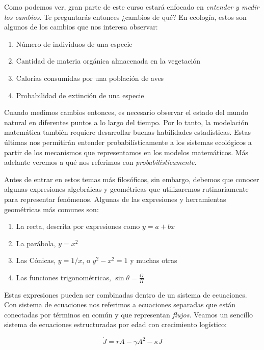 \documentclass[
]{book}
\providecommand{\tightlist}{%
  \setlength{\itemsep}{0pt}\setlength{\parskip}{0pt}}
\begin{document}
Como podemos ver, gran parte de este curso estará enfocado en \emph{entender y medir los cambios}. Te preguntarás entonces ¿cambios de qué? En ecología, estos son algunos de los cambios que nos interesa observar:

\begin{enumerate}
\def\labelenumi{\arabic{enumi}.}
\tightlist
\item
  Número de individuos de una especie
\item
  Cantidad de materia orgánica almacenada en la vegetación
\item
  Calorías consumidas por una población de aves
\item
  Probabilidad de extinción de una especie
\end{enumerate}

Cuando medimos cambios entonces, es necesario observar el estado del mundo natural en diferentes puntos a lo largo del tiempo. Por lo tanto, la modelación matemática también requiere desarrollar buenas habilidades estadísticas. Estas últimas nos permitirán entender probabilísticamente a los sistemas ecológicos a partir de los mecanismos que representamos en los modelos matemáticos. Más adelante veremos a qué nos referimos con \emph{probabilísticamente}.

Antes de entrar en estos temas más filosóficos, sin embargo, debemos que conocer algunas expresiones algebráicas y geométricas que utilizaremos rutinariamente para representar fenómenos. Algunas de las expresiones y herramientas geométricas más comunes son:

\begin{enumerate}
\def\labelenumi{\arabic{enumi}.}
\tightlist
\item
  La recta, descrita por expresiones como \(y = a + bx\)
\item
  La parábola, \(y = x^2\)
\item
  Las Cónicas, \(y = 1/x\), o \(y^2 - x^2 = 1\) y muchas otras
\item
  Las funciones trigonométricas, \(\sin \theta = \frac{O}{H}\)
\end{enumerate}

Estas expresiones pueden ser combinadas dentro de un sistema de ecuaciones. Con sistema de ecuaciones nos referimos a ecuaciones separadas que están conectadas por términos en común y que representan \emph{flujos}. Veamos un sencillo sistema de ecuaciones estructuradas por edad con crecimiento logístico:

\begin{equation}
    \dot{J} = rA - \gamma A^2 - \kappa J \label{eq:juv}
\end{equation}
\end{document}
